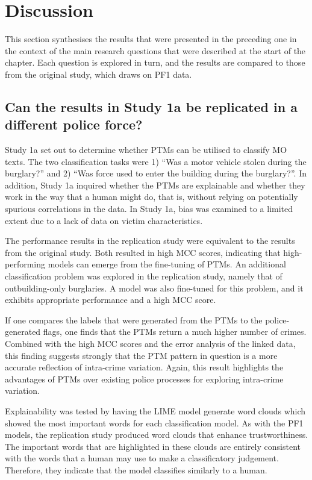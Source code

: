 \section{Discussion} This section synthesises the results that were presented in the preceding one in the context of the main research questions that were described at the start of the chapter. Each question is explored in turn, and the results are compared to those from the original study, which draws on PF1 data.

\subsection{Can the results in Study 1a be replicated in a different police force?}Study 1a set out to determine whether PTMs can be utilised to classify MO texts. The two classification tasks were 1) “Was a motor vehicle stolen during the burglary?” and 2) “Was force used to enter the building during the burglary?”. In addition, Study 1a inquired whether the PTMs are explainable and whether they work in the way that a human might do, that is, without relying on potentially spurious correlations in the data. In Study 1a, bias was examined to a limited extent due to a lack of data on victim characteristics.

The performance results in the replication study were equivalent to the results from the original study. Both resulted in high MCC scores, indicating that high-performing models can emerge from the fine-tuning of PTMs. An additional classification problem was explored in the replication study, namely that of outbuilding-only burglaries. A model was also fine-tuned for this problem, and it exhibits appropriate performance and a high MCC score.

If one compares the labels that were generated from the PTMs to the police-generated flags, one finds that the PTMs return a much higher number of crimes. Combined with the high MCC scores and the error analysis of the linked data, this finding suggests strongly that the PTM pattern in question is a more accurate reflection of intra-crime variation. Again, this result highlights the advantages of PTMs over existing police processes for exploring intra-crime variation.

Explainability was tested by having the LIME model generate word clouds which showed the most important words for each classification model. As with the PF1 models, the replication study produced word clouds that enhance trustworthiness. The important words that are highlighted in these clouds are entirely consistent with the words that a human may use to make a classificatory judgement. Therefore, they indicate that the model classifies similarly to a human.


